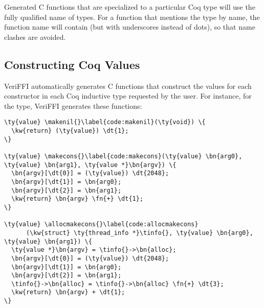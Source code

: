 Generated C functions that are specialized to a particular Coq type will use the fully qualified name of types. For a function that mentions the  type by name, the function name will contain  (but with underscores instead of dots), so that name clashes are avoided.

\subsection{Constructing Coq Values}

VeriFFI automatically generates C functions that construct the values for each constructor in each Coq \gls{inductive type} requested by the user. For instance, for the  type, VeriFFI generates these functions:\newpage

\newcommand{\makenil}{\hyperref[code:makenil]{\fn{make\_\linebreak[0]Coq\_\linebreak[0]Init\_\linebreak[0]Datatypes\_\linebreak[0]list\_\linebreak[0]nil}}}
\newcommand{\makecons}{\hyperref[code:makecons]{\fn{make\_\linebreak[0]Coq\_\linebreak[0]Init\_\linebreak[0]Datatypes\_\linebreak[0]list\_\linebreak[0]cons}}}
\newcommand{\allocmakecons}{\hyperref[code:allocmakecons]{\fn{alloc\_\linebreak[0]make\_\linebreak[0]Coq\_\linebreak[0]Init\_\linebreak[0]Datatypes\_\linebreak[0]list\_\linebreak[0]cons}}}
\begin{Verbatim}
\ty{value} \makenil{}\label{code:makenil}(\ty{void}) \{
  \kw{return} (\ty{value}) \dt{1};
\}

\ty{value} \makecons{}\label{code:makecons}(\ty{value} \bn{arg0}, \ty{value} \bn{arg1}, \ty{value *}\bn{argv}) \{
  \bn{argv}[\dt{0}] = (\ty{value}) \dt{2048};
  \bn{argv}[\dt{1}] = \bn{arg0};
  \bn{argv}[\dt{2}] = \bn{arg1};
  \kw{return} \bn{argv} \fn{+} \dt{1};
\}

\ty{value} \allocmakecons{}\label{code:allocmakecons}
      (\kw{struct} \ty{thread_info *}\tinfo{}, \ty{value} \bn{arg0}, \ty{value} \bn{arg1}) \{
  \ty{value *}\bn{argv} = \tinfo{}->\bn{alloc};
  \bn{argv}[\dt{0}] = (\ty{value}) \dt{2048};
  \bn{argv}[\dt{1}] = \bn{arg0};
  \bn{argv}[\dt{2}] = \bn{arg1};
  \tinfo{}->\bn{alloc} = \tinfo{}->\bn{alloc} \fn{+} \dt{3};
  \kw{return} \bn{argv} + \dt{1};
\}
\end{Verbatim}


